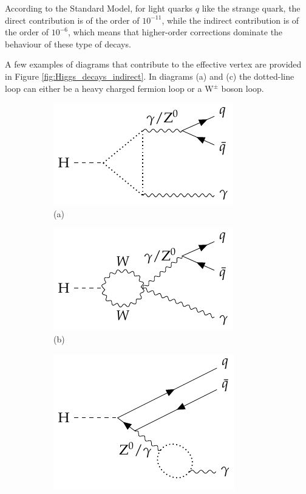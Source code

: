 According to the Standard Model, for light quarks $q$ like the strange quark, the direct contribution is of the order of $10^{-11}$, while the indirect contribution is of the order of $10^{-6}$, which means that higher-order corrections dominate the behaviour of these type of decays.

A few examples of diagrams that contribute to the effective vertex are provided in Figure \ref{fig:Higgs_decays_indirect}. In diagrams (a) and (c) the dotted-line loop can either be a heavy charged fermion loop or a W$^{\pm}$ boson loop.
\begin{figure}[!ht]
    \captionsetup[subfigure]{labelformat=empty}
    \vspace*{-0.2cm}
    \centering
    \setlength{\mylength}{\textwidth}
    \begin{subfigure}[t]{0.333\mylength}
            \centering
            \includegraphics[width=0.323\mylength]{resources/H_rare_indirect/v1.pdf}%
            \caption{\footnotesize (a)}
    \end{subfigure}%
    \begin{subfigure}[t]{0.333\mylength}
            \centering
            \includegraphics[width=0.323\mylength]{resources/H_rare_indirect/v2.pdf}%
            \caption{\footnotesize (b)}
    \end{subfigure}%
    \begin{subfigure}[t]{0.333\mylength}
            \centering
            \includegraphics[width=0.323\mylength]{resources/H_rare_indirect/v4.pdf}%

\end{subfigure}
\end{figure}
